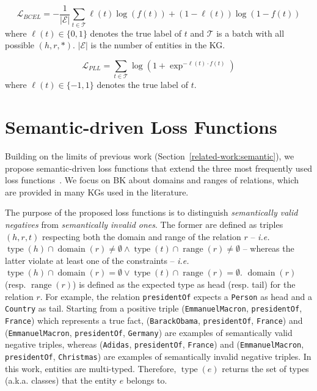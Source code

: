 \documentclass[letterpaper]{article} %
\begin{document}
\begin{equation}
\mathcal{L}_{BCEL} = -\frac{1}{|\mathcal{E}|}\sum_{t\in\mathcal{T}}
\ell(t)\log(f(t)) + (1-\ell(t))\log(1-f(t))
\label{eq:bcel-vanilla}
\end{equation}
where $\ell(t) \in \{0,1\}$ denotes the true label of $t$ and $\mathcal{T}$ is a batch with all possible $(h,r,*)$. $|\mathcal{E}|$ is the number of entities in the KG.

\begin{equation}
\mathcal{L}_{PLL} = \sum_{t\in\mathcal{T}}
\log(1+\exp^{-\ell(t) \cdot f(t)})
\label{eq:pll-vanilla}
\end{equation}
where $\ell(t) \in \{-1,1\}$ denotes the true label of $t$.

\section{Semantic-driven Loss Functions}\label{lossfunc}
Building on the limits of previous work (Section~\ref{related-work:semantic}), we propose semantic-driven loss functions that extend the three most frequently used loss functions~\cite{rossi}. 
We focus on BK about domains and ranges of relations, which are provided in many KGs used in the literature.

The purpose of the proposed loss functions is to distinguish \emph{semantically valid negatives} from \emph{semantically invalid ones}. The former are defined as triples $(h,r,t)$ respecting both the domain and range of the relation $r$ -- \textit{i.e.} $\operatorname{type}(h) \cap \operatorname{domain}(r) \neq \emptyset \land \operatorname{type}(t) \cap \operatorname{range}(r) \neq \emptyset$ -- whereas the latter violate at least one of the constraints -- \textit{i.e.} $\operatorname{type}(h) \cap \operatorname{domain}(r) = \emptyset \lor \operatorname{type}(t) \cap \operatorname{range}(r) = \emptyset$. $\operatorname{domain}(r)$ (resp. $\operatorname{range}(r)$) is defined as the expected type as head (resp. tail) for the relation $r$. For example, the relation \texttt{presidentOf} expects a \texttt{Person} as head and a \texttt{Country} as tail. Starting from a positive triple (\texttt{EmmanuelMacron}, \texttt{presidentOf}, \texttt{France}) which represents a true fact, (\texttt{BarackObama}, \texttt{presidentOf}, \texttt{France}) and (\texttt{EmmanuelMacron}, \texttt{presidentOf}, \texttt{Germany}) are examples of semantically valid negative triples, whereas (\texttt{Adidas}, \texttt{presidentOf}, \texttt{France}) and (\texttt{EmmanuelMacron}, \texttt{presidentOf}, \texttt{Christmas}) are examples of semantically invalid negative triples. In this work, entities are multi-typed. Therefore, $\operatorname{type}(e)$ returns the set of types (a.k.a. classes) that the entity $e$ belongs to.
\end{document}
